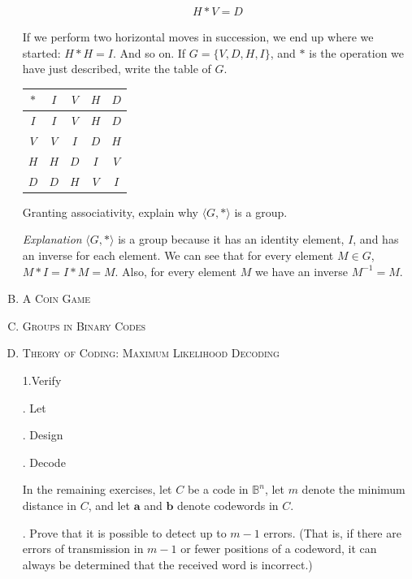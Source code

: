 \documentclass[twoside]{amsart}
\begin{document}
\begin{enumerate}[A.]
   \begin{gather*}
      H * V = D
   \end{gather*}

   \noindent If we perform two horizontal moves in succession, we end up where
   we started: $H*H=I$. And so on. If $G=\{V,D,H,I\}$, and $*$ is the operation
   we have just described, write the table of $G$.

   \begin{center}
   \begin{tabular}{c|cccc}
      $*$ & $I$ & $V$ & $H$ & $D$ \\ \hline
      $I$ & $I$ & $V$ & $H$ & $D$ \\
      $V$ & $V$ & $I$ & $D$ & $H$ \\
      $H$ & $H$ & $D$ & $I$ & $V$ \\
      $D$ & $D$ & $H$ & $V$ & $I$
   \end{tabular}
   \end{center}
   
   \noindent Granting associativity, explain why $\langle G,* \rangle$ is a
   group.

   \emph{Explanation} $\langle G,* \rangle$ is a group because
   it has an identity element, $I$, and has an inverse for each element.
   We can see that for every element $M \in G$, $M * I = I * M = M$.
   Also, for every element $M$ we have an inverse $M^{-1} = M$.

   

   \item \textsc{A Coin Game}

   \item \textsc{Groups in Binary Codes}

   \item \textsc{Theory of Coding: Maximum Likelihood Decoding}

      \noindent 1.Verify
      
      . Let
      
      . Design
      
      . Decode

      In the remaining exercises, let $C$ be a code in $\mathbb{B}^n$,
      let $m$ denote the minimum distance in $C$, and let 
      $\mathbf{a}$ and $\mathbf{b}$ denote codewords in $C$.

      . Prove that it is possible to detect up to $m-1$ errors.
      (That is, if there are errors of transmission in $m-1$ or 
      fewer positions of a codeword, it can always be determined
      that the received word is incorrect.)


\end{enumerate}
\end{document}
